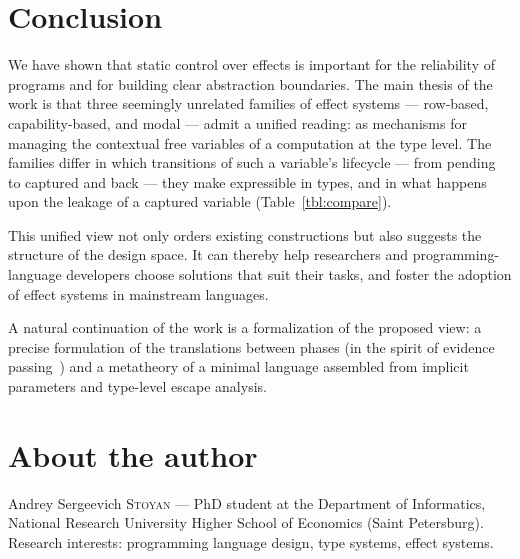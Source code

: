 \documentclass[11pt]{article}
\begin{document}
\section{Conclusion}
\label{sec:conclusion}

We have shown that static control over effects is important for the reliability of
programs and for building clear abstraction boundaries. The main thesis of the work is
that three seemingly unrelated families of effect systems --- row-based,
capability-based, and modal --- admit a unified reading: as mechanisms for managing the
contextual free variables of a computation at the type level. The families differ in
which transitions of such a variable's lifecycle --- from pending to captured and back
--- they make expressible in types, and in what happens upon the leakage of a captured
variable (Table~\ref{tbl:compare}).

This unified view not only orders existing constructions but also suggests the structure
of the design space. It can thereby help researchers and programming-language developers
choose solutions that suit their tasks, and foster the adoption of effect systems in
mainstream languages.

A natural continuation of the work is a formalization of the proposed view: a precise
formulation of the translations between phases (in the spirit of evidence
passing~\cite{xie2021generalized}) and a metatheory of a minimal language assembled from
implicit parameters and type-level escape analysis.


\printbibliography


\section*{About the author}
\noindent Andrey Sergeevich \textsc{Stoyan} --- PhD student at the Department of
Informatics, National Research University Higher School of Economics (Saint Petersburg).
Research interests: programming language design, type systems, effect systems.
\end{document}
